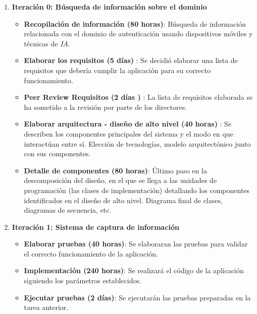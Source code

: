 \begin{enumerate}
    \item \textbf{Iteración 0: Búsqueda de información sobre el dominio}
    
    
    \begin{itemize}
        \item \textbf{Recopilación de información (80 horas)}: Búsqueda de información relacionada con el dominio de autenticación usando dispositivos móviles y técnicas de \textit{IA}.
        
        \item \textbf{Elaborar los requisitos (5 días)} : Se decidió elaborar una lista de requisitos que debería cumplir la aplicación para su correcto funcionamiento.
        
        \item \textbf{Peer Review Requisitos (2 días )} : La lista de requisitos elaborada se ha sometido a la revisión por parte de los directores.
    
        \item \textbf{Elaborar arquitectura - diseño de alto nivel (40 horas)} : Se describen los componentes principales del sistema y el modo en que interactúan entre sí. Elección de tecnologías, modelo arquitectónico junto con sus componentes.
    
        \item \textbf{Detalle de componentes (80 horas)}:  Último paso en la descomposición del diseño, en el que se llega a las unidades de programación (las clases de implementación) detallando los componentes identificados en el diseño de alto nivel. Diagrama final de clases, diagramas de secuencia, etc.
    \end{itemize}
    
    \item \textbf{Iteración 1:  Sistema de captura de información}
    \begin{itemize}
        \item \textbf{Elaborar pruebas (40 horas)}: Se elaboraran las pruebas para validar el correcto funcionamiento de la aplicación.
        
        \item \textbf{Implementación (240 horas)}: Se realizará el código de la aplicación siguiendo los parámetros establecidos.
        
        \item \textbf{Ejecutar pruebas (2 días)}: Se ejecutarán las pruebas preparadas en la tarea anterior.
    \end{itemize}
    

\end{enumerate}
